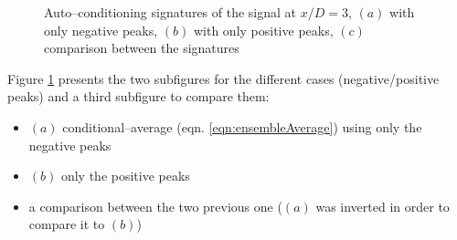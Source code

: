 \documentclass[english]{aiaa-tc}
\begin{document}
\begin{figure}
\centering{}

\caption{Auto--conditioning signatures of the signal at $x/D = 3$, $(a)$ with only negative peaks, $(b)$ with only positive peaks, $(c)$ comparison between the signatures} \label{fig:compPeaks}
\end{figure}
Figure \ref{fig:compPeaks} presents the two subfigures for the different cases (negative/positive peaks) and a third subfigure to compare them:
\begin{itemize}
  \item $(a)$ conditional--average (eqn. \ref{eqn:ensembleAverage}) using only the negative peaks
  \item $(b)$ only the positive peaks
  \item a comparison between the two previous one ($(a)$ was inverted in order to compare it to $(b)$)
\end{itemize}
\end{document}
